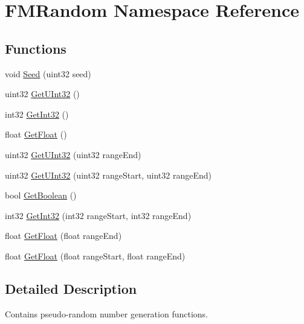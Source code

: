 \hypertarget{namespaceFMRandom}{
\section{FMRandom Namespace Reference}
\label{namespaceFMRandom}
}
\subsection*{Functions}
\begin{DoxyCompactItemize}
\item 
void \hyperlink{namespaceFMRandom_ab13d864bf41c5804317089d7dc42c999}{Seed} (uint32 seed)
\item 
uint32 \hyperlink{namespaceFMRandom_abb709744eb59370a74af9124d356aab6}{GetUInt32} ()
\item 
int32 \hyperlink{namespaceFMRandom_aa74dfbde860f9c28d25627f13995e90e}{GetInt32} ()
\item 
float \hyperlink{namespaceFMRandom_a9cdf009d4b4179d4eb6ef9a880ea186d}{GetFloat} ()
\item 
uint32 \hyperlink{namespaceFMRandom_a9d49d205904f669bf40425a9b78f04d9}{GetUInt32} (uint32 rangeEnd)
\item 
uint32 \hyperlink{namespaceFMRandom_ae74c317c88f9044f6b8aedd10d08a9bb}{GetUInt32} (uint32 rangeStart, uint32 rangeEnd)
\item 
bool \hyperlink{namespaceFMRandom_a7244bacf580f2107d4c347699a3922de}{GetBoolean} ()
\item 
int32 \hyperlink{namespaceFMRandom_aaacb4794f85ad5a175304f0bfdd8f228}{GetInt32} (int32 rangeStart, int32 rangeEnd)
\item 
float \hyperlink{namespaceFMRandom_a98a209eb9d4143f579ba23b49c311657}{GetFloat} (float rangeEnd)
\item 
float \hyperlink{namespaceFMRandom_aa25664775058fa677029759ef815b6bd}{GetFloat} (float rangeStart, float rangeEnd)
\end{DoxyCompactItemize}


\subsection{Detailed Description}
Contains pseudo-\/random number generation functions. 

